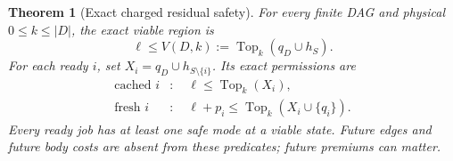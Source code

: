 \documentclass[acmsmall,screen,review,anonymous]{acmart}
\newtheorem{theorem}{Theorem}
\begin{document}
\begin{theorem}[Exact charged residual safety]
\label{thm:fee}
For every finite DAG and physical $0\le k\le|D|$, the exact viable region is
\begin{equation}
 \ell\le V(D,k):=\operatorname{Top}_k(q_D\cup h_S).
 \label{eq:chargedregion}
\end{equation}
For each ready $i$, set $X_i=q_D\cup h_{S\setminus\{i\}}$. Its exact permissions are
\begin{align}
 \text{cached }i &: \quad \ell\le\operatorname{Top}_k(X_i),\label{eq:chargedcached}\\
 \text{fresh }i &: \quad \ell+p_i\le\operatorname{Top}_k(X_i\cup\{q_i\}).\label{eq:chargedfilter}
\end{align}
Every ready job has at least one safe mode at a viable state. Future edges and future body costs are absent from these predicates; future premiums can matter.
\end{theorem}
\end{document}
